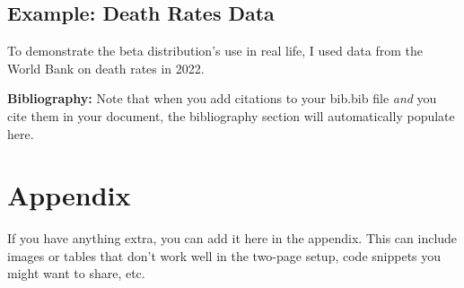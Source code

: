 \documentclass{article}\usepackage[]{graphicx}\usepackage[]{xcolor}
\begin{document}
\begin{multicols}{2}
\section{Example: Death Rates Data}
To demonstrate the beta distribution's use in real life, I used data from the World Bank on death rates in 2022. 

\vspace{2em}

\noindent\textbf{Bibliography:} Note that when you add citations to your bib.bib file \emph{and}
you cite them in your document, the bibliography section will automatically populate here.

\begin{tiny}

\end{tiny}
\end{multicols}

\newpage
\onecolumn
\section{Appendix}

If you have anything extra, you can add it here in the appendix. This can include images or tables that don't work well in the two-page setup, code snippets you might want to share, etc.
\end{document}
